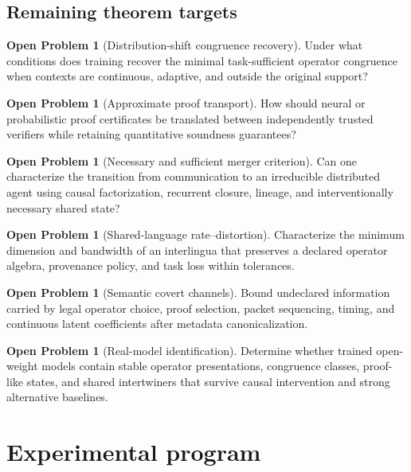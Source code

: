 \documentclass[11pt]{article}
\theoremstyle{definition}
\newtheorem{openproblem}[theorem]{Open Problem}
\theoremstyle{remark}
\begin{document}
\subsection{Remaining theorem targets}

\begin{openproblem}[Distribution-shift congruence recovery]
Under what conditions does training recover the minimal task-sufficient operator congruence when contexts are continuous, adaptive, and outside the original support?
\end{openproblem}

\begin{openproblem}[Approximate proof transport]
How should neural or probabilistic proof certificates be translated between independently trusted verifiers while retaining quantitative soundness guarantees?
\end{openproblem}

\begin{openproblem}[Necessary and sufficient merger criterion]
Can one characterize the transition from communication to an irreducible distributed agent using causal factorization, recurrent closure, lineage, and interventionally necessary shared state?
\end{openproblem}

\begin{openproblem}[Shared-language rate--distortion]
Characterize the minimum dimension and bandwidth of an interlingua that preserves a declared operator algebra, provenance policy, and task loss within tolerances.
\end{openproblem}

\begin{openproblem}[Semantic covert channels]
Bound undeclared information carried by legal operator choice, proof selection, packet sequencing, timing, and continuous latent coefficients after metadata canonicalization.
\end{openproblem}

\begin{openproblem}[Real-model identification]
Determine whether trained open-weight models contain stable operator presentations, congruence classes, proof-like states, and shared intertwiners that survive causal intervention and strong alternative baselines.
\end{openproblem}

\section{Experimental program}
\end{document}
